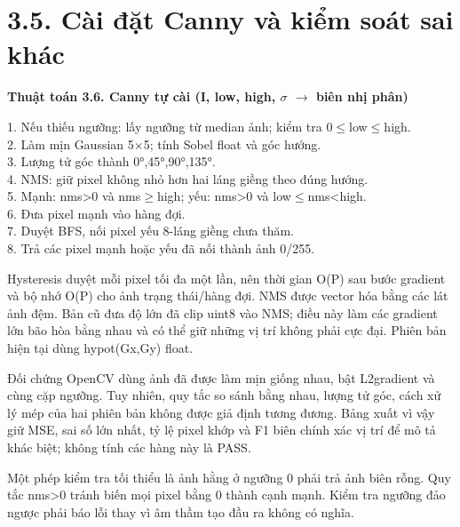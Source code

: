 \documentclass[12pt,a4paper]{extreport}
\begin{document}
\section*{3.5. Cài đặt Canny và kiểm soát sai khác}
\textbf{Thuật toán 3.6. Canny tự cài (I,\allowbreak{} low,\allowbreak{} high,\allowbreak{} \ensuremath{\sigma} \ensuremath{\rightarrow} biên nhị phân)}\par{\fontsize{10.5}{12}\selectfont\begin{flushleft}
1. Nếu thiếu ngưỡng: lấy ngưỡng từ median ảnh; kiểm tra 0\ensuremath{\leq}low\ensuremath{\leq}high.\\
2. Làm mịn Gaussian 5\ensuremath{\times}5; tính Sobel float và góc hướng.\\
3. Lượng tử góc thành 0°,\allowbreak{}45°,\allowbreak{}90°,\allowbreak{}135°.\\
4. NMS: giữ pixel không nhỏ hơn hai láng giềng theo đúng hướng.\\
5. Mạnh: nms>0 và nms\ensuremath{\geq}high; yếu: nms>0 và low\ensuremath{\leq}nms<high.\\
6. Đưa pixel mạnh vào hàng đợi.\\
7. Duyệt BFS,\allowbreak{} nối pixel yếu 8-láng giềng chưa thăm.\\
8. Trả các pixel mạnh hoặc yếu đã nối thành ảnh 0/\allowbreak{}255.\\
\end{flushleft}}
Hysteresis duyệt mỗi pixel tối đa một lần,\allowbreak{} nên thời gian O(P) sau bước gradient và bộ nhớ O(P) cho ảnh trạng thái/\allowbreak{}hàng đợi. NMS được vector hóa bằng các lát ảnh đệm. Bản cũ đưa độ lớn đã clip uint8 vào NMS; điều này làm các gradient lớn bão hòa bằng nhau và có thể giữ những vị trí không phải cực đại. Phiên bản hiện tại dùng hypot(Gx,\allowbreak{}Gy) float.
\par
Đối chứng OpenCV dùng ảnh đã được làm mịn giống nhau,\allowbreak{} bật L2gradient và cùng cặp ngưỡng. Tuy nhiên,\allowbreak{} quy tắc so sánh bằng nhau,\allowbreak{} lượng tử góc,\allowbreak{} cách xử lý mép của hai phiên bản không được giả định tương đương. Bảng xuất vì vậy giữ MSE,\allowbreak{} sai số lớn nhất,\allowbreak{} tỷ lệ pixel khớp và F1 biên chính xác vị trí để mô tả khác biệt; không tính các hàng này là PASS.
\par
Một phép kiểm tra tối thiểu là ảnh hằng ở ngưỡng 0 phải trả ảnh biên rỗng. Quy tắc nms>0 tránh biến mọi pixel bằng 0 thành cạnh mạnh. Kiểm tra ngưỡng đảo ngược phải báo lỗi thay vì âm thầm tạo đầu ra không có nghĩa.
\par
\end{document}
